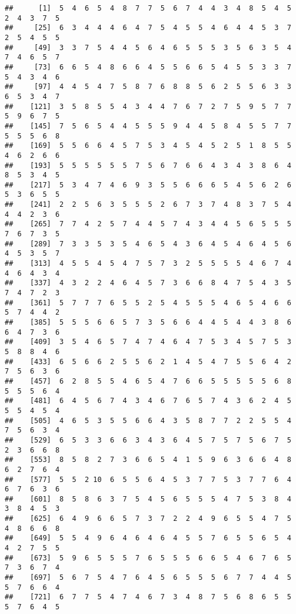 \documentclass[
]{book}
\begin{document}
\begin{verbatim}
##      [1]  5  4  6  5  4  8  7  7  5  6  7  4  4  3  4  8  5  4  5  2  4  3  7  5
##     [25]  6  3  4  4  4  6  4  7  5  4  5  5  4  6  4  4  5  3  7  2  5  4  5  5
##     [49]  3  3  7  5  4  4  5  6  4  6  5  5  5  3  5  6  3  5  4  7  4  6  5  7
##     [73]  6  6  5  4  8  6  6  4  5  5  6  6  5  4  5  5  3  3  7  5  4  3  4  6
##     [97]  4  4  5  4  7  5  8  7  6  8  8  5  6  2  5  5  6  3  3  6  5  3  4  7
##    [121]  3  5  8  5  5  4  3  4  4  7  6  7  2  7  5  9  5  7  7  5  9  6  7  5
##    [145]  7  5  6  5  4  4  5  5  5  9  4  4  5  8  4  5  5  7  7  5  5  5  6  8
##    [169]  5  5  6  6  4  5  7  5  3  4  5  4  5  2  5  1  8  5  5  4  6  2  6  6
##    [193]  5  5  5  5  5  5  7  5  6  7  6  6  4  3  4  3  8  6  4  8  5  3  4  5
##    [217]  5  3  4  7  4  6  9  3  5  5  6  6  6  5  4  5  6  2  6  5  3  6  5  5
##    [241]  2  2  5  6  3  5  5  5  2  6  7  3  7  4  8  3  7  5  4  4  4  2  3  6
##    [265]  7  7  4  2  5  7  4  4  5  7  4  3  4  4  5  6  5  5  5  7  6  7  3  5
##    [289]  7  3  3  5  3  5  4  6  5  4  3  6  4  5  4  6  4  5  6  4  5  3  5  7
##    [313]  4  5  5  4  5  4  7  5  7  3  2  5  5  5  5  4  6  7  4  4  6  4  3  4
##    [337]  4  3  2  2  4  6  4  5  7  3  6  6  8  4  7  5  4  3  5  7  4  7  2  3
##    [361]  5  7  7  7  6  5  5  2  5  4  5  5  5  4  6  5  4  6  6  5  7  4  4  2
##    [385]  5  5  5  6  6  5  7  3  5  6  6  4  4  5  4  4  3  8  6  6  4  7  3  6
##    [409]  3  5  4  6  5  7  4  7  4  6  4  7  5  3  4  5  7  5  3  5  8  8  4  6
##    [433]  6  5  6  6  2  5  5  6  2  1  4  5  4  7  5  5  6  4  2  7  5  6  3  6
##    [457]  6  2  8  5  5  4  6  5  4  7  6  6  5  5  5  5  5  6  8  5  5  5  6  4
##    [481]  6  4  5  6  7  4  3  4  6  7  6  5  7  4  3  6  2  4  5  5  5  4  5  4
##    [505]  4  6  5  3  5  5  6  6  4  3  5  8  7  7  2  2  5  5  4  7  5  6  3  4
##    [529]  6  5  3  3  6  6  3  4  3  6  4  5  7  5  7  5  6  7  5  2  3  6  6  8
##    [553]  8  5  8  2  7  3  6  6  5  4  1  5  9  6  3  6  6  4  8  6  2  7  6  4
##    [577]  5  5  2 10  6  5  5  6  4  5  3  7  7  5  3  7  7  6  4  6  7  6  3  6
##    [601]  8  5  8  6  3  7  5  4  5  6  5  5  5  4  7  5  3  8  4  3  8  4  5  3
##    [625]  6  4  9  6  6  5  7  3  7  2  2  4  9  6  5  5  4  7  5  4  8  6  6  8
##    [649]  5  5  4  9  6  4  6  4  6  4  5  5  7  6  5  5  6  5  4  4  2  7  5  5
##    [673]  5  9  6  5  5  5  7  6  5  5  5  6  6  5  4  6  7  6  5  7  3  6  7  4
##    [697]  5  6  7  5  4  7  6  4  5  6  5  5  5  6  7  7  4  4  5  5  7  6  6  4
##    [721]  6  7  7  5  4  7  4  6  7  3  4  8  7  5  6  8  6  5  5  5  7  6  4  5

\end{verbatim}
\end{document}
